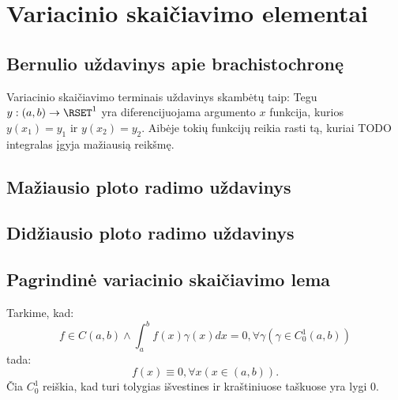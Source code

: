 
\section{Variacinio skaičiavimo elementai}

\subsection{Bernulio uždavinys apie brachistochronę}

\cite[18]{konspektas}

Variacinio skaičiavimo terminais uždavinys skambėtų taip:
Tegu $y: (a, b) \to \RSET^{1}$ yra diferencijuojama argumento $x$
funkcija, kurios $y(x_{1})=y_{1}$ ir $y(x_{2})=y_{2}$. Aibėje
tokių funkcijų reikia rasti tą, kuriai TODO integralas įgyja
mažiausią reikšmę.

\subsection{Mažiausio ploto radimo uždavinys}

\cite[19]{konspektas}

\subsection{Didžiausio ploto radimo uždavinys}

\cite[20]{konspektas}

\subsection{Pagrindinė variacinio skaičiavimo lema}

\begin{prop}
  Tarkime, kad:
  \begin{equation*}
    f \in C(a, b) \land \int _{a}^{b}f(x)\gamma(x)dx = 0, %
      \forall \gamma (\gamma \in C_{0}^{1}(a, b))
  \end{equation*}
  tada:
  \begin{equation*}
    f(x) \equiv 0, \forall x (x \in (a, b)).
  \end{equation*}
  Čia $C^{1}_{0}$ reiškia, kad turi tolygias išvestines ir kraštiniuose
  taškuose yra lygi 0.
\end{prop}

\cite[23]{konspektas}

\newcommand{\MSET}{\mathfrak{M}}

